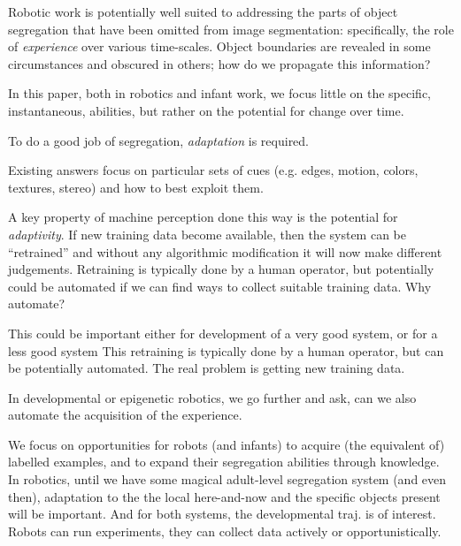 %
Robotic work is potentially well suited to addressing the
parts of object segregation that have been omitted from image
segmentation: specifically, the role of {\em experience} over
various time-scales.  Object boundaries are revealed in some
circumstances and obscured in others; how do we propagate this
information?  
%


In this paper, both in robotics and infant work, we focus
little on the specific, instantaneous, abilities, but 
rather on the potential for change over time.





To do a good job of segregation, {\em adaptation} is required.


Existing answers
focus on particular sets of cues (e.g. edges, motion, colors,
textures, stereo) and how to best exploit them.



A key property of machine perception done this way is the potential 
for {\em adaptivity}.  If new training data become available,
then the system can be ``retrained'' and without any algorithmic
modification it will now make different judgements.
%
Retraining is typically done by a human operator, but potentially 
could be automated if we can find ways to collect suitable
training data.  Why automate?


This could be important either for development of a very good system,
or for a less good system
%
This retraining is typically done by a human operator,
but can be potentially automated.  The real problem is getting
new training data.

In developmental or epigenetic robotics, we go further and ask,
can we also automate the acquisition of the experience.
%



We focus on opportunities for robots (and infants) to acquire
(the equivalent of) labelled examples, and to expand their
segregation abilities through knowledge.  In robotics,
until we have some magical adult-level segregation system
(and even then), adaptation to the the local here-and-now
and the specific objects present will be important.  And for
both systems, the developmental traj. is of interest.
Robots can run experiments, they can collect data actively
or opportunistically.




